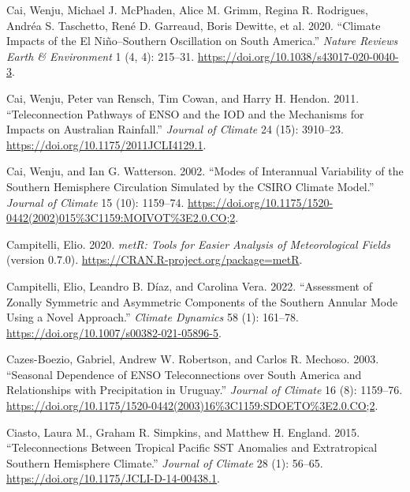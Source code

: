 \documentclass[smallextended]{svjour3}       %
\newlength{\cslhangindent}
\newlength{\cslentryspacingunit} %
\newenvironment{CSLReferences}[2] %
 {%
  \setlength{\parindent}{0pt}
  \ifodd #1
  \let\oldpar\par
  \def\par{\hangindent=\cslhangindent\oldpar}
  \fi
  \setlength{\parskip}{#2\cslentryspacingunit}
 }%
 {}
\begin{document}
\begin{CSLReferences}{1}{0}
\leavevmode{}%
Cai, Wenju, Michael J. McPhaden, Alice M. Grimm, Regina R. Rodrigues, Andréa S. Taschetto, René D. Garreaud, Boris Dewitte, et al. 2020. {``Climate Impacts of the {El Niño}--{Southern Oscillation} on {South America}.''} \emph{Nature Reviews Earth \& Environment} 1 (4, 4): 215--31. \url{https://doi.org/10.1038/s43017-020-0040-3}.

\leavevmode{}%
Cai, Wenju, Peter van Rensch, Tim Cowan, and Harry H. Hendon. 2011. {``Teleconnection {Pathways} of {ENSO} and the {IOD} and the {Mechanisms} for {Impacts} on {Australian Rainfall}.''} \emph{Journal of Climate} 24 (15): 3910--23. \url{https://doi.org/10.1175/2011JCLI4129.1}.

\leavevmode{}%
Cai, Wenju, and Ian G. Watterson. 2002. {``Modes of {Interannual Variability} of the {Southern Hemisphere Circulation Simulated} by the {CSIRO Climate Model}.''} \emph{Journal of Climate} 15 (10): 1159--74. \url{https://doi.org/10.1175/1520-0442(2002)015\%3C1159:MOIVOT\%3E2.0.CO;2}.

\leavevmode{}%
Campitelli, Elio. 2020. \emph{{metR}: {Tools} for {Easier Analysis} of {Meteorological Fields}} (version 0.7.0). \url{https://CRAN.R-project.org/package=metR}.

\leavevmode{}%
Campitelli, Elio, Leandro B. Díaz, and Carolina Vera. 2022. {``Assessment of Zonally Symmetric and Asymmetric Components of the {Southern Annular Mode} Using a Novel Approach.''} \emph{Climate Dynamics} 58 (1): 161--78. \url{https://doi.org/10.1007/s00382-021-05896-5}.

\leavevmode{}%
Cazes-Boezio, Gabriel, Andrew W. Robertson, and Carlos R. Mechoso. 2003. {``Seasonal {Dependence} of {ENSO Teleconnections} over {South America} and {Relationships} with {Precipitation} in {Uruguay}.''} \emph{Journal of Climate} 16 (8): 1159--76. \url{https://doi.org/10.1175/1520-0442(2003)16\%3C1159:SDOETO\%3E2.0.CO;2}.

\leavevmode{}%
Ciasto, Laura M., Graham R. Simpkins, and Matthew H. England. 2015. {``Teleconnections Between {Tropical Pacific SST Anomalies} and {Extratropical Southern Hemisphere Climate}.''} \emph{Journal of Climate} 28 (1): 56--65. \url{https://doi.org/10.1175/JCLI-D-14-00438.1}.


\end{CSLReferences}
\end{document}
